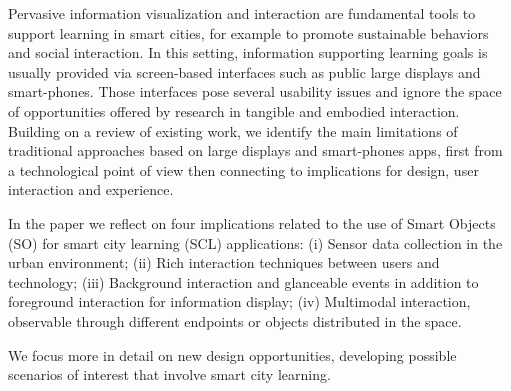 Pervasive information visualization and interaction are fundamental tools to support learning in smart cities, for example to promote sustainable behaviors and social interaction. In this setting, information supporting learning goals is usually provided via screen-based interfaces such as public large displays and smart-phones. Those interfaces pose several usability issues and ignore the space of opportunities offered by research in tangible and embodied interaction.
Building on a review of existing work, we identify the main limitations of traditional approaches based on large displays and smart-phones apps, first from a technological point of view then connecting to implications for design, user interaction and experience.

In the paper we reflect on four implications related to the use of Smart Objects (SO) for smart city learning (SCL) applications: (i) Sensor data collection in the urban environment; (ii) Rich interaction techniques between users and technology; (iii) Background interaction and glanceable events in addition to foreground interaction for information display; (iv) Multimodal interaction, observable through different endpoints or objects distributed in the space.

We focus more in detail on new design opportunities, developing possible scenarios of interest that involve smart city learning.

